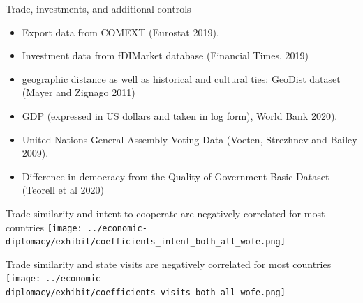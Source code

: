 \documentclass[
  ignorenonframetext,
  aspectratio=16,
]{beamer}
\providecommand{\tightlist}{%
  \setlength{\itemsep}{0pt}\setlength{\parskip}{0pt}}
\begin{document}
\begin{frame}{Trade, investments, and additional controls}
\protect\hypertarget{trade-investments-and-additional-controls}{}
\begin{itemize}
\tightlist
\item
  Export data from COMEXT (Eurostat 2019).
\item
  Investment data from fDIMarket database (Financial Times, 2019)
\item
  geographic distance as well as historical and cultural ties: GeoDist
  dataset (Mayer and Zignago 2011)
\item
  GDP (expressed in US dollars and taken in log form), World Bank 2020).
\item
  United Nations General Assembly Voting Data (Voeten, Strezhnev and
  Bailey 2009).
\item
  Difference in democracy from the Quality of Government Basic Dataset
  (Teorell et al 2020)
\end{itemize}
\end{frame}

\begin{frame}{Trade similarity and intent to cooperate are negatively
correlated for most countries}
\protect\hypertarget{trade-similarity-and-intent-to-cooperate-are-negatively-correlated-for-most-countries}{}
\texttt{[image: ../economic-diplomacy/exhibit/coefficients\_intent\_both\_all\_wofe.png]}
\end{frame}

\begin{frame}{Trade similarity and state visits are negatively
correlated for most countries}
\protect\hypertarget{trade-similarity-and-state-visits-are-negatively-correlated-for-most-countries}{}
\texttt{[image: ../economic-diplomacy/exhibit/coefficients\_visits\_both\_all\_wofe.png]}
\end{frame}
\end{document}
